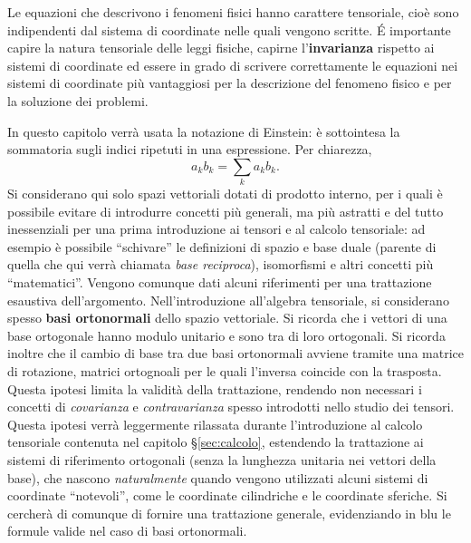 

Le equazioni che descrivono i fenomeni fisici hanno carattere tensoriale,
 cioè sono indipendenti dal sistema di coordinate nelle quali vengono scritte.
\'E importante capire la natura tensoriale delle leggi fisiche, capirne
 l'\textbf{invarianza} rispetto ai sistemi di coordinate ed essere in grado di
 scrivere correttamente le equazioni nei sistemi di coordinate più vantaggiosi
 per la descrizione del fenomeno fisico e per la soluzione dei problemi.

\vspace{0.2cm}
\noindent
In questo capitolo verrà usata la notazione di Einstein: è sottointesa la sommatoria
 sugli indici ripetuti in una espressione. Per chiarezza,
\begin{equation}
 a_k b_k = \displaystyle\sum_k a_k b_k .
\end{equation}
%
Si considerano qui solo spazi vettoriali dotati di 
 prodotto interno, per i quali è possibile evitare di introdurre concetti
 più generali, ma più astratti e del tutto inessenziali per una prima
 introduzione ai tensori e al calcolo tensoriale: ad esempio è possibile
 ``schivare'' le definizioni di spazio e base duale (parente di quella che qui
 verrà chiamata \textit{base reciproca}), isomorfismi e altri concetti più
 ``matematici''. Vengono comunque dati alcuni riferimenti per una trattazione esaustiva
 dell'argomento.
\newline \noindent
Nell'introduzione all'algebra tensoriale, si considerano spesso \textbf{basi ortonormali} dello spazio vettoriale. Si ricorda che i vettori di una base ortogonale hanno modulo unitario e sono tra di loro ortogonali.
Si ricorda inoltre che il cambio di base tra due basi ortonormali avviene tramite una matrice di rotazione, matrici ortognoali per le quali l'inversa coincide con la trasposta.
Questa ipotesi limita la validità della trattazione, rendendo non necessari i concetti di \textit{covarianza} e \textit{contravarianza} spesso introdotti nello studio dei tensori. Questa ipotesi verrà leggermente rilassata durante l'introduzione al calcolo tensoriale contenuta nel capitolo \S\ref{sec:calcolo}, estendendo la trattazione ai sistemi di riferimento ortogonali (senza la lunghezza unitaria nei vettori della base), che nascono \textit{naturalmente} quando vengono utilizzati alcuni sistemi di coordinate ``notevoli'', come le coordinate cilindriche e le coordinate sferiche. {\color{blue} Si cercherà di comunque di fornire una trattazione generale, evidenziando in blu le formule valide nel caso di basi ortonormali}.

